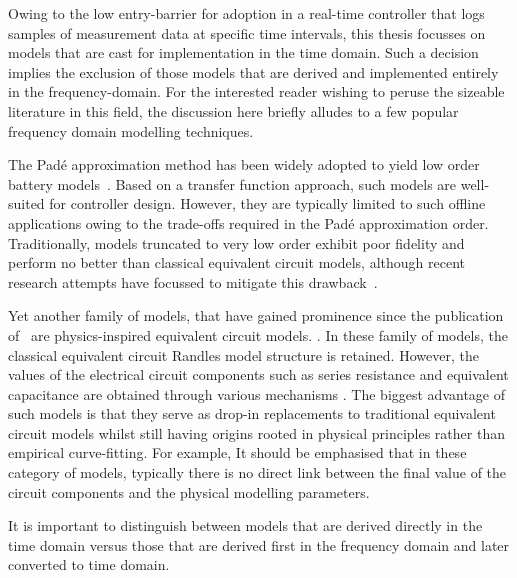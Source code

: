Owing to the low entry-barrier for adoption in a real-time controller that logs samples of
measurement data at specific time intervals, this thesis focusses on models that are cast for
implementation in the time domain. Such a decision implies the exclusion of those models that are
derived and implemented entirely in the frequency-domain. For the interested reader wishing to
peruse the sizeable literature in this field, the discussion here briefly alludes to a few popular
frequency domain modelling techniques.

The Padé approximation method has been widely adopted to yield low order battery
models~\cite{Forman2011}. Based on a transfer function
approach, such models are well-suited for controller design. However, they are typically limited to
such offline applications owing to the trade-offs required in the Padé approximation order.
Traditionally, models truncated to very low order exhibit poor fidelity and perform no better than
classical equivalent circuit models, although recent research attempts have focussed to mitigate
this drawback~\cite{Yuan2017a,Yuan2017}.

Yet another family of models, that have gained prominence since the publication of~\cite{Jokar2016} are physics-inspired
equivalent circuit models. . In these family of
models, the classical equivalent circuit Randles model structure is retained. However, the values of the electrical
circuit components such as series resistance and equivalent capacitance  are obtained through various mechanisms
. The biggest advantage of such models is that they serve as drop-in replacements to traditional
equivalent circuit models whilst still having origins rooted in physical principles rather than empirical curve-fitting.
For example,
It should be emphasised that in these category of models, typically there is no direct
link between the final value of the circuit components and the physical modelling parameters.

It is important to distinguish between models that are derived directly in the
time domain versus those that are derived first in the frequency domain and later converted to time
domain.

